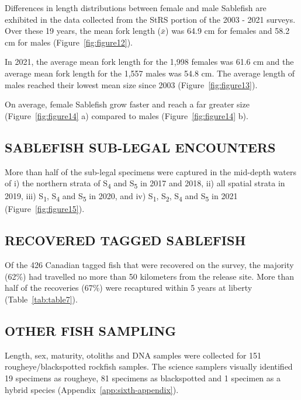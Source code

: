 \documentclass[12pt]{article}\usepackage[]{graphicx}\usepackage[]{color}
\begin{document}
Differences in length distributions between female and male Sablefish are exhibited in the data collected from the StRS portion of the 2003 - 2021 surveys. Over these 19 years, the mean fork length (\(\bar{x}\)) was 64.9 cm for females and 58.2 cm for males (Figure~\ref{fig:figure12}).

In 2021, the average mean fork length for the 1,998 females was 61.6 cm and the average mean fork length for the 1,557 males was 54.8 cm. The average length of males reached their lowest mean size since 2003 (Figure~\ref{fig:figure13}).

On average, female Sablefish grow faster and reach a far greater size (Figure~\ref{fig:figure14} a) compared to males (Figure~\ref{fig:figure14} b).

\hypertarget{sablefish-sub-legal-encounters}{%
\subsection{SABLEFISH SUB-LEGAL ENCOUNTERS}\label{sablefish-sub-legal-encounters}}

More than half of the sub-legal specimens were captured in the mid-depth waters of i) the northern strata of S\textsubscript{4} and S\textsubscript{5} in 2017 and 2018, ii) all spatial strata in 2019, iii) S\textsubscript{1}, S\textsubscript{4} and S\textsubscript{5} in 2020, and iv) S\textsubscript{1}, S\textsubscript{2}, S\textsubscript{4} and S\textsubscript{5} in 2021 (Figure~\ref{fig:figure15}).

\hypertarget{recovered-tagged-sablefish}{%
\subsection{RECOVERED TAGGED SABLEFISH}\label{recovered-tagged-sablefish}}

Of the 426 Canadian tagged fish that were recovered on the survey, the majority (62\%) had travelled no more than 50 kilometers from the release site. More than half of the recoveries (67\%) were recaptured within 5 years at liberty (Table~\ref{tab:table7}).

\hypertarget{other-fish-sampling}{%
\subsection{OTHER FISH SAMPLING}\label{other-fish-sampling}}

Length, sex, maturity, otoliths and DNA samples were collected for 151 rougheye/blackspotted rockfish samples. The science samplers visually identified 19 specimens as rougheye, 81 specimens as blackspotted and 1 specimen as a hybrid species (Appendix~\ref{app:sixth-appendix}).
\end{document}
